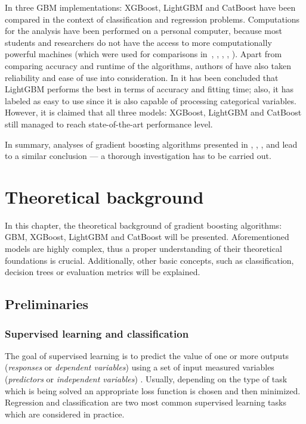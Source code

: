 \documentclass[magisterska, english]{pwr_wmat_praca_dyplomowa}
\theoremstyle{plain}
\numberwithin{theorem}{chapter}
\theoremstyle{definition}
\numberwithin{theorem}{chapter}
\begin{document}
In \cite{comparison_of} three GBM implementations: XGBoost, LightGBM and CatBoost have been compared in the context of classification and regression problems. Computations for the analysis have been performed on a personal computer, because most students and researchers do not have the access to more computationally powerful machines (which were used for comparisons in~\cite{xgboost}, \cite{lightgbm}, \cite{catboost}, \cite{comparative_analysis}, \cite{competitive_analysis}). Apart from comparing accuracy and runtime of the algorithms, authors of \cite{comparison_of} have also taken reliability and ease of use into consideration. In \cite{comparative_analysis} it has been concluded that LightGBM performs the best in terms of accuracy and fitting time; also, it has labeled as easy to use since it is also capable of processing categorical variables. However, it is claimed that all three models: XGBoost, LightGBM and CatBoost still managed to reach state-of-the-art performance level.

In summary, analyses of gradient boosting algorithms presented in \cite{lightgbm}, \cite{catboost}, \cite{comparative_analysis}, \cite{competitive_analysis} and \cite{comparison_of} lead to a similar conclusion --- a thorough investigation has to be carried out.

\chapter{Theoretical background}\label{chapter:theory}
In this chapter, the theoretical background of gradient boosting algorithms: GBM, XGBoost, LightGBM and CatBoost will be presented. Aforementioned models are highly complex, thus a proper understanding of their theoretical foundations is crucial. Additionally, other basic concepts, such as classification, decision trees or evaluation metrics will be explained.

\section{Preliminaries}
\subsection{Supervised learning and classification}
The goal of supervised learning is to predict the value of one or more outputs (\emph{responses} or \emph{dependent variables}) using a set of input measured variables (\emph{predictors} or \emph{independent variables}) \cite{esl}. Usually, depending on the type of task which is being solved an appropriate loss function is chosen and then minimized. Regression and classification are two most common supervised learning tasks which are considered in practice.
\end{document}

